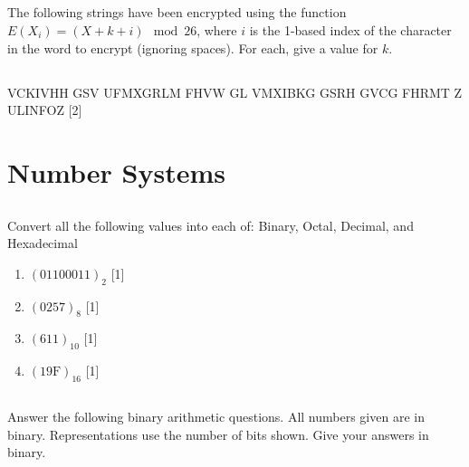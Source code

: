 \documentclass[twocolumn]{article}
\newcounter{pmarks}
\newcounter{marks}
\newcommand\mrk[1]{{\hfill\color{blue}\small[{#1}]}\addtocounter{pmarks}{#1}\addtocounter{marks}{#1}}
\begin{document}
\subsection{}

    The following strings have been encrypted using the function $E(X_i) = (X + k + i) \mod 26$, where $i$ is the 1-based index of the character in the word to encrypt (ignoring spaces). For each, give a value for $k$.


\subsection{}

VCKIVHH GSV UFMXGRLM FHVW GL VMXIBKG GSRH GVCG FHRMT Z ULINFOZ \mrk{2}

\clearpage
\section{Number Systems}

\subsection{}

    Convert all the following values into each of: Binary, Octal, Decimal, and Hexadecimal

    \begin{enumerate}
        \item $ ( 01100011 )_2 $ \mrk{1}
        \item $ ( 0257)_8 $ \mrk{1}
        \item $ ( 611 )_{10} $ \mrk{1}
        \item $ ( 19\text{F} )_{16} $ \mrk{1}
    \end{enumerate}

\subsection{}

    Answer the following binary arithmetic questions. All numbers given are in binary. Representations use the number of bits shown. Give your answers in binary.
\end{document}
